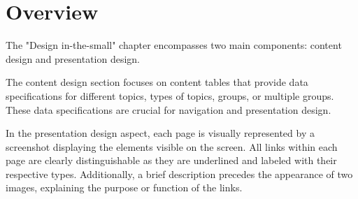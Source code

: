 \documentclass[../../DD.tex]{subfiles}
\begin{document}
\section{Overview}
   The "Design in-the-small" chapter encompasses two main components: content design and presentation design.

   The content design section focuses on content tables that provide data specifications for different topics, types of topics, groups, or multiple groups. These data specifications are crucial for navigation and presentation design.
    
    In the presentation design aspect, each page is visually represented by a screenshot displaying the elements visible on the screen. All links within each page are clearly distinguishable as they are underlined and labeled with their respective types. Additionally, a brief description precedes the appearance of two images, explaining the purpose or function of the links.
    \clearpage

\end{document}
